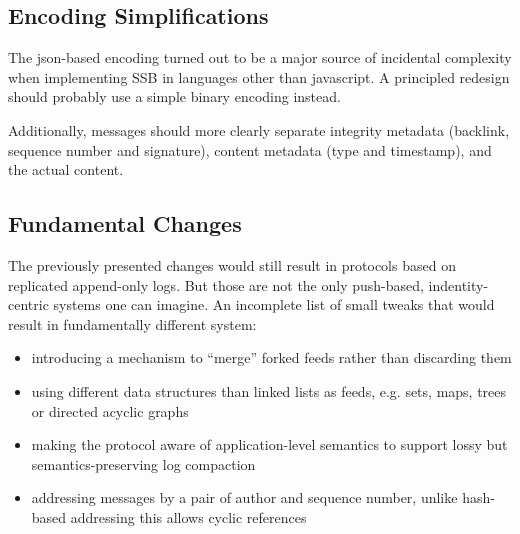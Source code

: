 \documentclass[10pt,sigconf,rewiew]{acmart}
\begin{document}
\subsection{Encoding Simplifications}

The json-based encoding turned out to be a major source of incidental complexity when implementing SSB in languages other than javascript. A principled redesign should probably use a simple binary encoding instead.

Additionally, messages should more clearly separate integrity metadata (backlink, sequence number and signature), content metadata (type and timestamp), and the actual content.

\subsection{Fundamental Changes}

The previously presented changes would still result in protocols based on replicated append-only logs. But those are not the only push-based, indentity-centric systems one can imagine. An incomplete list of small tweaks that would result in fundamentally different system:

\begin{itemize}
 \item introducing a mechanism to ``merge'' forked feeds rather than discarding them
 \item using different data structures than linked lists as feeds, e.g. sets, maps, trees or directed acyclic graphs
 \item making the protocol aware of application-level semantics to support lossy but semantics-preserving log compaction
 \item addressing messages by a pair of author and sequence number, unlike hash-based addressing this allows cyclic references
\end{itemize}



\end{document}
